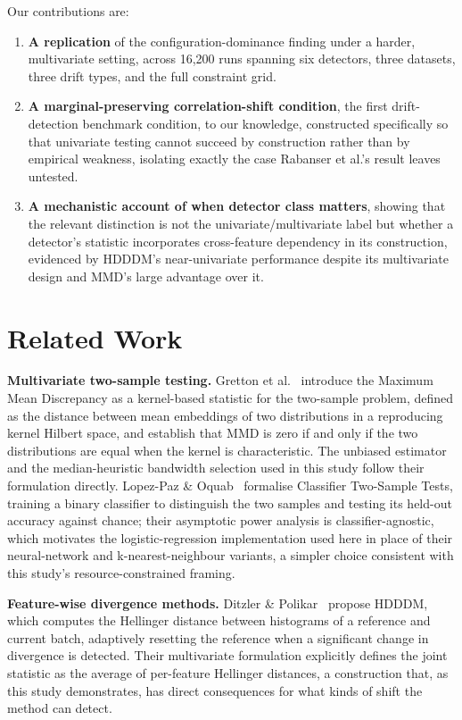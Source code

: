 \documentclass[conference]{IEEEtran}
\begin{document}
Our contributions are:

\begin{enumerate}
\item \textbf{A replication} of the configuration-dominance finding under a harder, multivariate setting, across 16,200 runs spanning six detectors, three datasets, three drift types, and the full constraint grid.
\item \textbf{A marginal-preserving correlation-shift condition}, the first drift-detection benchmark condition, to our knowledge, constructed specifically so that univariate testing cannot succeed by construction rather than by empirical weakness, isolating exactly the case Rabanser et al.'s result leaves untested.
\item \textbf{A mechanistic account of when detector class matters}, showing that the relevant distinction is not the univariate/multivariate label but whether a detector's statistic incorporates cross-feature dependency in its construction, evidenced by HDDDM's near-univariate performance despite its multivariate design and MMD's large advantage over it.
\end{enumerate}

\section{Related Work}

\textbf{Multivariate two-sample testing.} Gretton et al.~\cite{gretton2012} introduce the Maximum Mean Discrepancy as a kernel-based statistic for the two-sample problem, defined as the distance between mean embeddings of two distributions in a reproducing kernel Hilbert space, and establish that MMD is zero if and only if the two distributions are equal when the kernel is characteristic. The unbiased estimator and the median-heuristic bandwidth selection used in this study follow their formulation directly. Lopez-Paz \& Oquab~\cite{lopezpaz2017} formalise Classifier Two-Sample Tests, training a binary classifier to distinguish the two samples and testing its held-out accuracy against chance; their asymptotic power analysis is classifier-agnostic, which motivates the logistic-regression implementation used here in place of their neural-network and k-nearest-neighbour variants, a simpler choice consistent with this study's resource-constrained framing.

\textbf{Feature-wise divergence methods.} Ditzler \& Polikar~\cite{ditzler2011} propose HDDDM, which computes the Hellinger distance between histograms of a reference and current batch, adaptively resetting the reference when a significant change in divergence is detected. Their multivariate formulation explicitly defines the joint statistic as the average of per-feature Hellinger distances, a construction that, as this study demonstrates, has direct consequences for what kinds of shift the method can detect.
\end{document}
